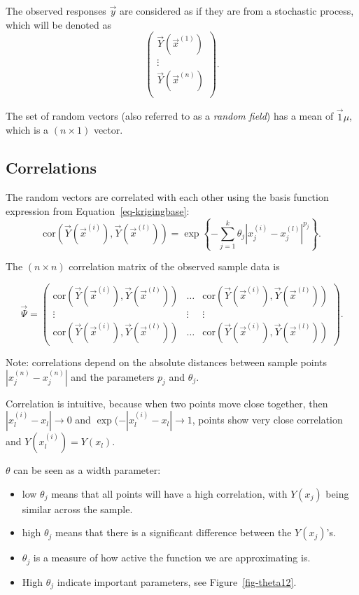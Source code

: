 \documentclass[
  letterpaper,
  DIV=11,
  numbers=noendperiod]{scrreprt}
\providecommand{\tightlist}{%
  \setlength{\itemsep}{0pt}\setlength{\parskip}{0pt}}\usepackage{longtable,booktabs,array}
\begin{document}
The observed responses \(\vec{y}\) are considered as if they are from a
stochastic process, which will be denoted as \[
\begin{pmatrix}
\vec{Y}(\vec{x}^{(1)})\\
\vdots\\
\vec{Y}(\vec{x}^{(n)})\\
\end{pmatrix}.
\]

The set of random vectors (also referred to as a \emph{random field})
has a mean of \(\vec{1} \mu\), which is a \((n\times 1)\) vector.

\subsection{Correlations}\label{correlations}

The random vectors are correlated with each other using the basis
function expression from Equation~\ref{eq-krigingbase}: \[
\text{cor} \left(\vec{Y}(\vec{x}^{(i)}),\vec{Y}(\vec{x}^{(l)}) \right) = \exp\left\{ - \sum_{j=1}^k \theta_j |x_j^{(i)} - x_j^{(l)} |^{p_j}\right\}.
\]

The \((n \times n)\) correlation matrix of the observed sample data is

\[
\vec{\Psi} = \begin{pmatrix}
\text{cor}\left(
\vec{Y}(\vec{x}^{(i)}),
\vec{Y}(\vec{x}^{(l)}) 
\right) & \ldots &
\text{cor}\left(
\vec{Y}(\vec{x}^{(i)}),
\vec{Y}(\vec{x}^{(l)}) 
\right)\\
\vdots  & \vdots &  \vdots\\
 \text{cor}\left(
\vec{Y}(\vec{x}^{(i)}),
\vec{Y}(\vec{x}^{(l)}) 
\right)&
\ldots &
\text{cor}\left(
\vec{Y}(\vec{x}^{(i)}),
\vec{Y}(\vec{x}^{(l)}) 
\right)
\end{pmatrix}.
\]

Note: correlations depend on the absolute distances between sample
points \(|x_j^{(n)} - x_j^{(n)}|\) and the parameters \(p_j\) and
\(\theta_j\).

Correlation is intuitive, because when two points move close together,
then \(|x_l^{(i)} - x_l| \to 0\) and \(\exp(-|x_l^{(i)} - x_l| \to 1\),
points show very close correlation and \(Y(x_l^{(i)}) = Y(x_l)\).

\(\theta\) can be seen as a width parameter:

\begin{itemize}
\tightlist
\item
  low \(\theta_j\) means that all points will have a high correlation,
  with \(Y(x_j)\) being similar across the sample.
\item
  high \(\theta_j\) means that there is a significant difference between
  the \(Y(x_j)\)'s.
\item
  \(\theta_j\) is a measure of how active the function we are
  approximating is.
\item
  High \(\theta_j\) indicate important parameters, see
  Figure~\ref{fig-theta12}.
\end{itemize}
\end{document}
